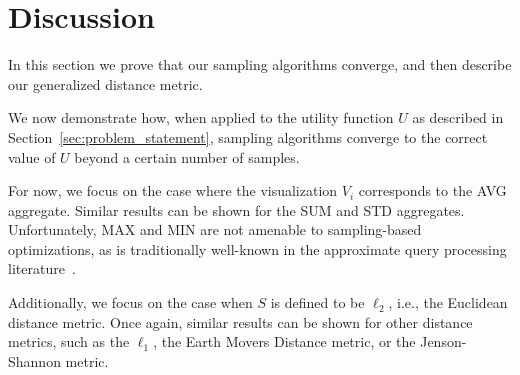
\section{Discussion}\label{sec:discussion}
In this section we prove that our sampling 
algorithms converge, and then describe our generalized
distance metric.

We now demonstrate how,
when applied to the utility function $U$ as described
in Section~\ref{sec:problem_statement},
sampling algorithms 
converge to the correct value of $U$ beyond a certain number of samples.

For now, we focus on the case where the visualization $V_i$
corresponds to the AVG aggregate. 
Similar results can be shown for the SUM and STD
aggregates. 
Unfortunately, MAX and MIN are not amenable to sampling-based
optimizations, as is traditionally well-known in the approximate
query processing literature~\cite{wavelets,dbo}.

Additionally, we focus on the case when $S$ is defined to be
$\ell_2$, i.e., the Euclidean distance metric. 
Once again, similar results can be shown for other distance metrics,
such as the $\ell_1$, the Earth Movers Distance metric, or
the Jenson-Shannon metric.

